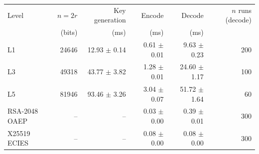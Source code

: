 \begin{tabular}{lrrrrr}
\toprule
Level & $n=2r$ & Key generation & Encode & Decode & $n$ runs (decode)\\
 & (bits) & (ms) & (ms) & (ms) & \\
\midrule
L1 & 24646 & 12.93 $\pm$ 0.14 & 0.61 $\pm$ 0.01 & 9.63 $\pm$ 0.23 & 200\\
L3 & 49318 & 43.77 $\pm$ 3.82 & 1.28 $\pm$ 0.01 & 24.60 $\pm$ 1.17 & 100\\
L5 & 81946 & 93.46 $\pm$ 3.26 & 3.04 $\pm$ 0.07 & 51.72 $\pm$ 1.64 & 60\\
\midrule
RSA-2048 OAEP & -- & -- & 0.03 $\pm$ 0.00 & 0.39 $\pm$ 0.01 & 300\\
X25519 ECIES & -- & -- & 0.08 $\pm$ 0.00 & 0.08 $\pm$ 0.00 & 300\\
\bottomrule
\end{tabular}
